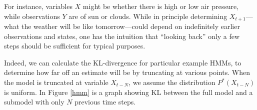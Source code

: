 \documentclass[10pt,letterpaper]{article}
\begin{document}
\begin{figure}[h] 
\begin{center}
\end{center} 
\end{figure} 
\noindent For instance, variables $X$ might be whether there is high or low air pressure, while observations $Y$ are of sun or clouds. While in principle determining $X_{t+1}$---what the weather will be like tomorrow---could depend on indefinitely earlier observations and states, one has the intuition that ``looking back'' only a few steps should be sufficient for typical purposes.

Indeed, we can calculate the KL-divergence for particular example HMMs, to determine how far off an estimate will be by truncating at various points. When the model is truncated at variable $X_{t-N}$, we assume the distribution $P^{*}(X_{t-N})$ is uniform.  In Figure \ref{hmm} is a graph showing KL between the full model and a submodel with only $N$ previous time steps.
\end{document}
